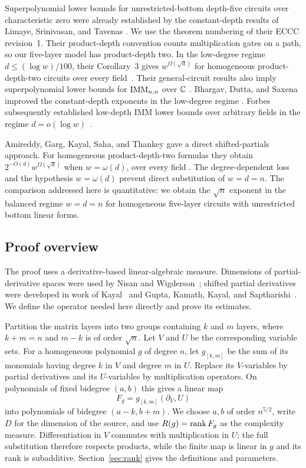 Superpolynomial lower bounds for unrestricted-bottom depth-five circuits
over characteristic zero were already established by the constant-depth
results of Limaye, Srinivasan, and Tavenas
\cite{LimayeSrinivasanTavenas2021,LimayeSrinivasanTavenas2025}.
We use the theorem numbering of their ECCC revision~1.
Their product-depth convention counts multiplication gates on a path, so
our five-layer model has product-depth two.  In the low-degree regime
$d\leq(\log w)/100$, their Corollary~3 gives
$w^{\Omega(\sqrt d)}$ for homogeneous product-depth-two circuits over every
field~\cite[Corollary~3]{LimayeSrinivasanTavenas2021}.
Their general-circuit results also imply superpolynomial lower bounds for
$\operatorname{IMM}_{n,n}$ over $\mathbb C$
\cite[Corollary~4 and the following discussion]{LimayeSrinivasanTavenas2021}.
Bhargav, Dutta, and Saxena improved the constant-depth exponents in the
low-degree regime \cite{BhargavDuttaSaxena2022}.
Forbes subsequently established low-depth IMM lower bounds over arbitrary
fields in the regime $d=o(\log w)$~\cite[Theorem~10]{Forbes2024}.

Amireddy, Garg, Kayal, Saha, and Thankey gave a direct shifted-partials
approach.  For homogeneous product-depth-two formulas they obtain
$2^{-O(d)}w^{\Omega(\sqrt d)}$ when $w=\omega(d)$, over every field
\cite[Theorem~24]{AmireddyGargKayalSahaThankey2023}.
The degree-dependent loss and the hypothesis $w=\omega(d)$ prevent direct
substitution of $w=d=n$.  The comparison addressed here is quantitative:
we obtain the $\sqrt n$ exponent in the balanced regime $w=d=n$ for
homogeneous five-layer circuits with unrestricted bottom linear forms.

\subsection{Proof overview}

The proof uses a derivative-based linear-algebraic measure.  Dimensions of
partial-derivative spaces were used by Nisan and
Wigderson~\cite{NisanWigderson1995}; shifted partial derivatives were developed
in work of Kayal~\cite{Kayal2012} and Gupta, Kamath, Kayal, and
Saptharishi~\cite{GuptaKamathKayalSaptharishi2014}.
We define the operator needed here directly and prove its estimates.

Partition the matrix layers into two groups containing $k$ and $m$ layers,
where $k+m=n$ and $m-k$ is of order $\sqrt n$.  Let $V$ and $U$ be the
corresponding variable sets.  For a homogeneous polynomial $g$ of degree
$n$, let $g_{[k,m]}$ be the sum of its monomials having degree $k$ in $V$ and
degree $m$ in $U$.  Replace its $V$-variables by partial derivatives and
its $U$-variables by multiplication operators.  On polynomials of fixed
bidegree $(a,b)$ this gives a linear map
\[
 F_g=g_{[k,m]}(\partial_V,U)
\]
into polynomials of bidegree $(a-k,b+m)$.  We choose $a,b$ of order
$n^{5/2}$, write $D$ for the dimension of the source, and use
$R(g)=\operatorname{rank} F_g$ as the complexity measure.  Differentiation in $V$ commutes
with multiplication in $U$; the full substitution therefore respects
products, while the finite map is linear in $g$ and its rank is subadditive.
Section~\ref{sec:rank} gives the definitions and parameters.

